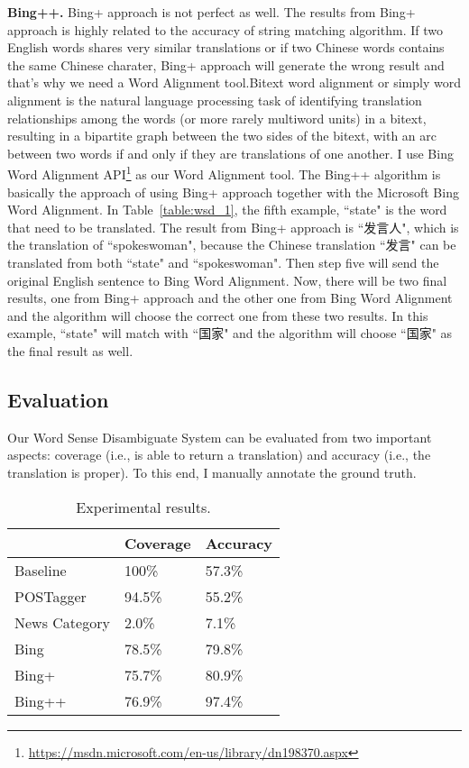 \begin{CJK}{UTF8}{gbsn}
{\bf Bing++.}
Bing+ approach is not perfect as well. The results from Bing+ approach is highly related to the accuracy of string matching algorithm. If two English words shares very similar translations or if two Chinese words contains the same Chinese charater, Bing+ approach will generate the wrong result and that's why we need a Word Alignment tool.Bitext word alignment or simply word alignment is the natural language processing task of identifying translation relationships among the words (or more rarely multiword units) in a bitext, resulting in a bipartite graph between the two sides of the bitext, with an arc between two words if and only if they are translations of one another. I use Bing Word Alignment API\footnote{\url{https://msdn.microsoft.com/en-us/library/dn198370.aspx}} as our Word Alignment tool.
The Bing++ algorithm is basically the approach of using Bing+ approach together with the Microsoft Bing Word Alignment. In Table~\ref{table:wsd_1}, the fifth example, ``state" is the word that need to be translated. The result from Bing+ approach is ``发言人", which is the translation of ``spokeswoman", because the Chinese translation ``发言" can be translated from both ``state" and ``spokeswoman". Then step five will send the original English sentence to Bing Word Alignment. Now, there will be two final results, one from Bing+ approach and the other one from Bing Word Alignment and the algorithm will choose the correct one from these two results. In this example, ``state" will match with ``国家" and the algorithm will choose ``国家" as the final result as well.

\subsection{Evaluation}
Our Word Sense Disambiguate System can be evaluated from two important aspects: coverage (i.e., is able to return a translation) and accuracy (i.e., the translation is proper). To this end, I manually annotate the ground truth.


\begin{table}[ht]
  \caption{Experimental results.}
  \label{table:evaluation_1}
  \begin{tabular}{| p{2cm} | p{2cm} | p{2cm} |}
    \hline
     & Coverage & Accuracy\\
    \hline
    Baseline & 100\% & 57.3\%\\
    \hline
    POSTagger & 94.5\% & 55.2\%\\
    \hline
    News Category & 2.0\% & 7.1\%\\
    \hline
    Bing & 78.5\% & 79.8\%\\
    \hline
    Bing+ & 75.7\% & 80.9\%\\
    \hline
    Bing++ & 76.9\% & 97.4\%\\
    \hline
  \end{tabular}
\end{table}


\end{CJK}

